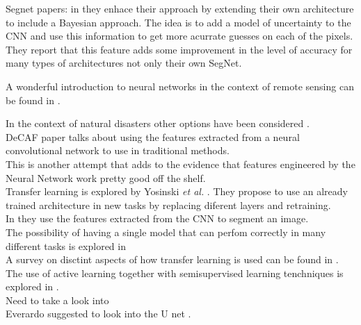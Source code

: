 Segnet papers: \cite{DBLP:journals/corr/BadrinarayananK15} in \cite{DBLP:journals/corr/KendallBC15} they enhace their approach by extending their own architecture to include a Bayesian approach. The idea is to add a model of uncertainty to the CNN and use this information to get more acurrate guesses on each of the pixels. They report that this feature adds some improvement in the level of accuracy for many types of architectures not only their own SegNet.


A wonderful introduction to neural networks in the context of remote sensing can be found in \cite{canty2014image}.

In the context of natural disasters other options have been considered \cite{Kryvasheyeue1500779}.\\

DeCAF paper talks about using the features extracted from a neural convolutional network to use in traditional methods. \cite{DBLP:journals/corr/DonahueJVHZTD13}\\

This is another attempt that adds to the evidence that features engineered by the Neural Network work pretty good off the shelf. \cite{DBLP:journals/corr/RazavianASC14}\\

Transfer learning is explored by Yosinski \textit{et al.} \cite{DBLP:journals/corr/YosinskiCBL14}. They propose to use an already trained architecture in new tasks by replacing diferent layers and retraining.\\

In \cite{DBLP:journals/corr/LongSD14} they use the features extracted from the CNN to segment an image.\\

The possibility of having a single model that can perfom correctly in many different tasks is explored in \cite{DBLP:journals/corr/KaiserGSVPJU17}\\

A survey on disctint aspects of how transfer learning is used can be found in \cite{5288526}.\\

The use of active learning together with semisupervised learning tenchniques is explored in \cite{7956153}.\\

Need to take a look into \cite{DBLP:journals/corr/ChenPKMY14}\\

Everardo suggested to look into the U net \cite{DBLP:journals/corr/RonnebergerFB15}.


